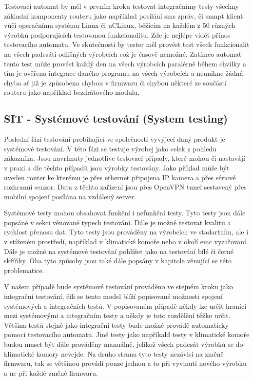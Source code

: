 Testovací automat by měl v prvním kroku testovat integračnímy testy všechny základní komponenty routeru jako například posílání sms zpráv, či smnpt klient vůči operačnímu systému Linux či uCLinux, běžícím na každém z 50 různých výrobků podporujících testovanou funkcionalitu. Zde je nejlépe vidět přínos testovacího automatu. Ve skutečnosti by tester měl provést test všech funkcionalit na všech padesáti odlišných výrobcích což je časově nemožné. Zatímco automat tento test může provést každý den na všech výrobcích paralérně během chvilky a tím je ověřena integrace daného programu na všech výrobcích a neunikne žádná chyba ať již je způsobena chybou v firmwaru či chybou některé ze součástí routeru jako například bezdrátového modulu.

\subsection{SIT - Systémové testování (System testing)}
Poslední fází testování probíhající ve společnosti vyvýjecí daný produkt je systémové testování. V této fázi se testuje výrobej jako celek z pohledu zákazníka. Jsou navrhnuty jednotlive testovací případy, které mohou či nastavájí v praxi a dle těchto případů jsou výrobky testovány. Jako příklad může být uveden router ke kterému je přes ethernet připojena IP kamera a přes sériové rozhranní senzor. Data z těchto zařízení jsou přes OpenVPN tunel sestavený přes mobilní spojení posílána na vzdálený server.

Systémové testy mohou obsahovat funkční i nefunkční testy. Tyto testy jsou dále popsáné v sekci věnované typech testování. Dále je možné testovat kvalitu a rychlost přenosu dat. Tyto testy jsou prováděny na výrobcích ve stadartním, ale i v stíženém prostředí, například v klimatické komoře nebo v okolí emc vyzařovaní. Dále je možné na systémové testování pohlížet jako na testování bílé či černé skříňky. Oba tyto způsoby jsou také dále popsány v kapitole věnující se této problematice.

V našem případě bude systémové testování prováděno ve stejném kroku jako integrační testování, čili se tento model blíží popisované možnosti spojení systémových a integračních testů. V popisovaném případě někdy lze určit hranici mezi systémovými a integračním testy a někdy je toto rozdělění těžko určit. Většina testů stejně jako integrační testy bude možné provádě automaticky pomocí testovacího automatu. Jiné testy jako napříkald testy v klimatické komoře budou muset být dále prováděny manuálně, jelikož všech padesát výrobků se do klimatické komory nevejde. Na druho stranu tyto testy nezávisí na změně firmwaru, tak se většinou provádí pouze jednou a to při vyvinutí nového výrobku a ne při každé změně firmwaru.

